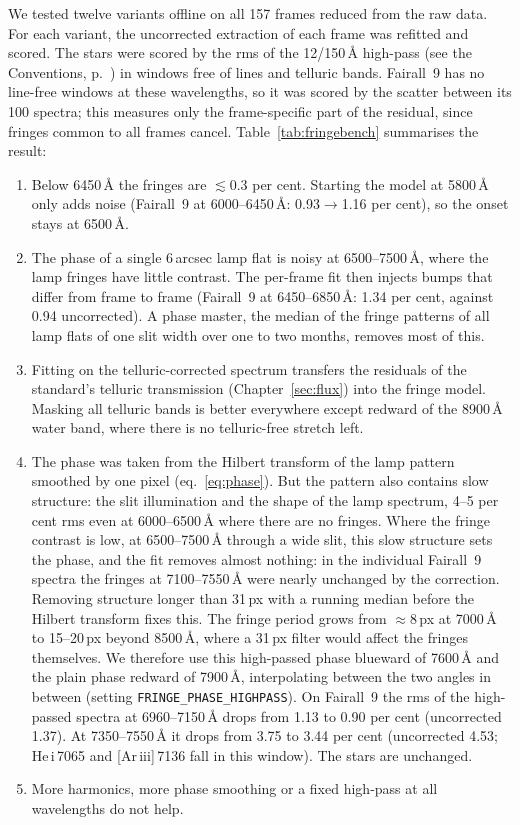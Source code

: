 We tested twelve variants offline on all 157 frames reduced from the raw data. For each variant, the uncorrected
extraction of each frame was refitted and scored. The stars were scored by the rms of the 12/150\,\AA{} high-pass
(see the Conventions, p.~\pageref{sec:conventions}) in windows free of lines and telluric bands. Fairall~9 has no line-free windows at
these wavelengths, so it was scored by the scatter between its 100 spectra; this measures only the frame-specific
part of the residual, since fringes common to all frames cancel. Table~\ref{tab:fringebench} summarises the result:
\begin{enumerate}
\item Below 6450\,\AA{} the fringes are $\lesssim0.3$ per cent. Starting the model at 5800\,\AA{} only adds noise
(Fairall~9 at 6000--6450\,\AA: 0.93$\rightarrow$1.16 per cent), so the onset stays at 6500\,\AA.
\item The phase of a single 6\,arcsec lamp flat is noisy at 6500--7500\,\AA, where the lamp fringes have little
contrast. The per-frame fit then injects bumps that differ from frame to frame (Fairall~9 at 6450--6850\,\AA:
1.34 per cent, against 0.94 uncorrected). A phase master, the median of the fringe patterns of all lamp flats of one
slit width over one to two months, removes most of this.
\item Fitting on the telluric-corrected spectrum transfers the residuals of the standard's telluric transmission
(Chapter~\ref{sec:flux}) into the fringe model. Masking all telluric bands is better everywhere except redward of
the 8900\,\AA{} water band, where there is no telluric-free stretch left.
\item The phase was taken from the Hilbert transform of the lamp pattern smoothed by one pixel (eq.~\ref{eq:phase}).
But the pattern also contains slow structure: the slit illumination and the shape of the lamp spectrum, 4--5 per cent
rms even at 6000--6500\,\AA{} where there are no fringes. Where the fringe contrast is low, at 6500--7500\,\AA{}
through a wide slit, this slow structure sets the phase, and the fit removes almost nothing: in the individual
Fairall~9 spectra the fringes at 7100--7550\,\AA{} were nearly unchanged by the correction. Removing structure longer
than 31\,px with a running median before the Hilbert transform fixes this. The fringe period grows from
$\approx8$\,px at 7000\,\AA{} to 15--20\,px beyond 8500\,\AA, where a 31\,px filter would affect the fringes
themselves. We therefore use this high-passed phase blueward of 7600\,\AA{} and the plain phase redward of
7900\,\AA, interpolating between the two angles in between (setting \texttt{FRINGE\_PHASE\_HIGHPASS}). On Fairall~9
the rms of the high-passed spectra at 6960--7150\,\AA{} drops from 1.13 to 0.90 per cent (uncorrected 1.37). At
7350--7550\,\AA{} it drops from 3.75 to 3.44 per cent (uncorrected 4.53; He\,{\sc i}\,7065 and
[Ar\,{\sc iii}]\,7136 fall in this window). The stars are unchanged.
\item More harmonics, more phase smoothing or a fixed high-pass at all wavelengths do not help.
\end{enumerate}
